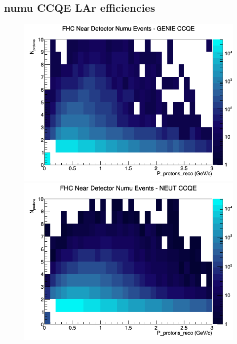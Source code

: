 \documentclass[12pt]{article}
\begin{document}
\subsection{numu CCQE LAr efficiencies}
\begin{figure}[h]
\includegraphics[width=\linewidth]{eff_N_P/LAr/protons/CCQE_FHC_ND_numu_N_P_GENIE.png}
\endminipage
{}
\includegraphics[width=\linewidth]{eff_N_P/LAr/protons/CCQE_FHC_ND_numu_N_P_NEUT.png}
\endminipage
{}

\end{figure}
\end{document}
